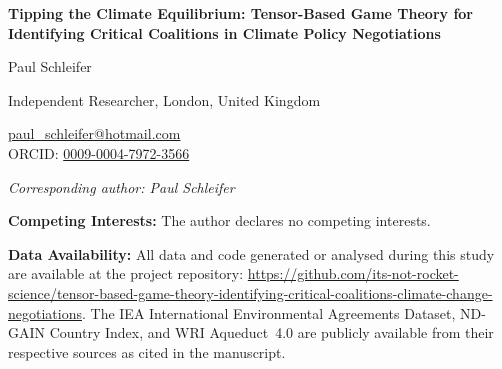 \documentclass[11pt]{article}
\begin{document}
\thispagestyle{empty}

\begin{center}
{\Large\textbf{Tipping the Climate Equilibrium: Tensor-Based Game Theory for Identifying Critical Coalitions in Climate Policy Negotiations}}

\vspace{1.5em}

{\large Paul Schleifer}

\vspace{0.5em}

Independent Researcher, London, United Kingdom

\vspace{0.5em}

\href{mailto:paul_schleifer@hotmail.com}{paul\_schleifer@hotmail.com}\\
ORCID: \href{https://orcid.org/0009-0004-7972-3566}{0009-0004-7972-3566}

\vspace{0.5em}

\textit{Corresponding author: Paul Schleifer}
\end{center}

\bigskip

\noindent\textbf{Competing Interests:} The author declares no competing interests.

\bigskip

\noindent\textbf{Data Availability:} All data and code generated or analysed during this study are available at the project repository: \url{https://github.com/its-not-rocket-science/tensor-based-game-theory-identifying-critical-coalitions-climate-change-negotiations}. The IEA International Environmental Agreements Dataset, ND-GAIN Country Index, and WRI Aqueduct~4.0 are publicly available from their respective sources as cited in the manuscript.
\end{document}
